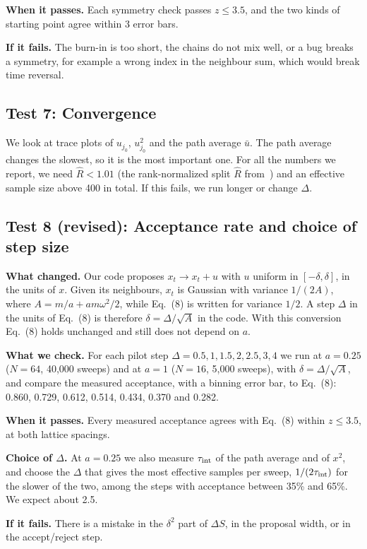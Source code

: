 \documentclass[11pt]{article}
\begin{document}
\textbf{When it passes.} Each symmetry check passes $z\le3.5$, and the two
kinds of starting point agree within 3 error bars.

\textbf{If it fails.} The burn-in is too short, the chains do not mix well, or a
bug breaks a symmetry, for example a wrong index in the neighbour sum, which
would break time reversal.

\subsection*{Test 7: Convergence}
We look at trace plots of $u_{j_0}$, $u_{j_0}^2$ and the path average $\bar u$. The path average changes the slowest, so it is the most important one. For all the numbers we report, we need $\hat R < 1.01$ (the rank-normalized split $\hat R$ from~\cite{vehtari}) and an effective sample size above 400 in total. If this fails, we run longer or change $\Delta$.

\subsection*{Test 8 (revised): Acceptance rate and choice of step size}

\textbf{What changed.} Our code proposes $x_t\to x_t+u$ with $u$ uniform in
$[-\delta,\delta]$, in the units of $x$. Given its neighbours, $x_t$ is
Gaussian with variance $1/(2A)$, where $A=m/a+am\omega^2/2$, while Eq.~(8) is
written for variance $1/2$. A step $\Delta$ in the units of Eq.~(8) is therefore
$\delta=\Delta/\sqrt{A}$ in the code. With this conversion Eq.~(8) holds
unchanged and still does not depend on $a$.

\textbf{What we check.} For each pilot step $\Delta=0.5,1,1.5,2,2.5,3,4$ we run
at $a=0.25$ ($N=64$, 40{,}000 sweeps) and at $a=1$ ($N=16$, 5{,}000 sweeps), with
$\delta=\Delta/\sqrt{A}$, and compare the measured acceptance, with a binning
error bar, to Eq.~(8): 0.860, 0.729, 0.612, 0.514, 0.434, 0.370 and 0.282.

\textbf{When it passes.} Every measured acceptance agrees with Eq.~(8) within
$z\le3.5$, at both lattice spacings.

\textbf{Choice of $\Delta$.} At $a=0.25$ we also measure $\tau_{\rm int}$ of the
path average and of $x^2$, and choose the $\Delta$ that gives the most
effective samples per sweep, $1/(2\tau_{\rm int})$ for the slower of the two,
among the steps with acceptance between 35\% and 65\%. We expect about 2.5.

\textbf{If it fails.} There is a mistake in the $\delta^2$ part of $\Delta S$, in
the proposal width, or in the accept/reject step.
\end{document}
